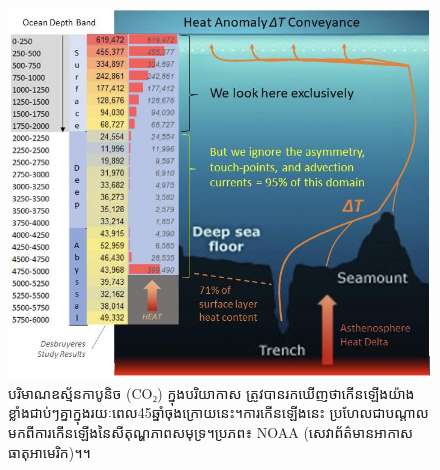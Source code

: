 \documentclass[10pt,twocolumn,letterpaper]{article}
\begin{document}
\begin{figure}[t]
\begin{center}
\includegraphics[width=1\textwidth]{deepsea.jpg}
\end{center}
   \caption{បរិមាណឧស្ម័នកាបូនិច (CO₂) ក្នុងបរិយាកាស ត្រូវបានរកឃើញថាកើនឡើងយ៉ាងខ្លាំងជាប់ៗគ្នាក្នុងរយៈពេល45ឆ្នាំចុងក្រោយនេះ។ការកើនឡើងនេះ ប្រហែលជាបណ្តាលមកពីការកើនឡើងនៃសីតុណ្ហភាពសមុទ្រ។ប្រភព៖ NOAA (សេវាព័ត៌មានអាកាសធាតុអាមេរិក)។\cite{2,129}។}
\label{fig:21}
\end{figure}
\end{document}
